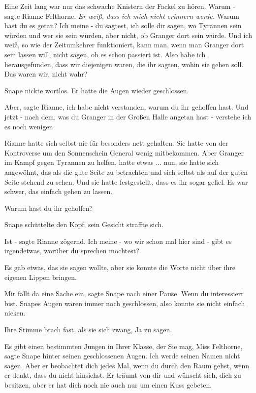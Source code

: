 Eine Zeit lang war nur das schwache Knistern der Fackel zu hören. \glqq{}Warum
-\grqq{} sagte Rianne Felthorne.\emph{ Er weiß, dass ich mich nicht erinnern
werde.} \glqq{}Warum hast du es getan? Ich meine - du sagtest, ich solle dir
sagen, wo Tyrannen sein würden und wer sie sein würden, aber nicht, ob Granger
dort sein würde. Und ich weiß, so wie der Zeitumkehrer funktioniert, kann man,
wenn man Granger dort sein lassen will, nicht sagen, ob es schon passiert ist.
Also habe ich herausgefunden, dass wir diejenigen waren, die ihr sagten, wohin
sie gehen soll. Das waren wir, nicht wahr?\grqq{}

Snape nickte wortlos. Er hatte die Augen wieder geschlossen.

\glqq{}Aber\grqq{}, sagte Rianne, \glqq{}ich habe nicht verstanden, warum du ihr
geholfen hast. Und jetzt - nach dem, was du Granger in der Großen Halle angetan
hast - verstehe ich es noch weniger.\grqq{}

Rianne hatte sich selbst nie für besonders nett gehalten. Sie hatte von der
Kontroverse um den Sonnenschein General wenig mitbekommen. Aber Granger im Kampf
gegen Tyrannen zu helfen, hatte etwas ... nun, sie hatte sich angewöhnt, das als
die gute Seite zu betrachten und sich selbst als auf der guten Seite stehend zu
sehen. Und sie hatte festgestellt, dass es ihr sogar gefiel. Es war schwer, das
einfach gehen zu lassen.

\glqq{}Warum hast du ihr geholfen?\grqq{}

Snape schüttelte den Kopf, sein Gesicht straffte sich.

\glqq{}Ist -\grqq{} sagte Rianne zögernd. \glqq{}Ich meine - wo wir schon mal hier
sind - gibt es irgendetwas, worüber du sprechen möchtest?\grqq{}

Es gab etwas, das sie sagen wollte, aber sie konnte die Worte nicht über ihre
eigenen Lippen bringen.

\glqq{}Mir fällt da eine Sache ein\grqq{}, sagte Snape nach einer Pause. \glqq{}
Wenn du interessiert bist.\grqq{} Snapes Augen waren immer noch geschlossen,
also konnte sie nicht einfach nicken.

Ihre Stimme brach fast, als sie sich zwang, \glqq{}Ja\grqq{} zu sagen.

\glqq{}Es gibt einen bestimmten Jungen in Ihrer Klasse, der Sie mag, Miss
Felthorne\grqq{}, sagte Snape hinter seinen geschlossenen Augen. \glqq{}Ich werde
seinen Namen nicht sagen. Aber er beobachtet dich jedes Mal, wenn du durch den
Raum gehst, wenn er denkt, dass du nicht hinsiehst. Er träumt von dir und
wünscht sich, dich zu besitzen, aber er hat dich noch nie auch nur um einen Kuss
gebeten.\grqq{}

